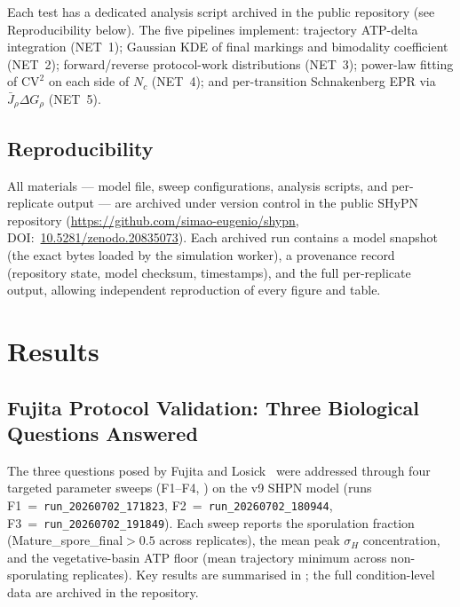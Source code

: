\documentclass[11pt,a4paper]{article}
\newcommand{\CV}{\mathrm{CV}}
\begin{document}
Each test has a dedicated analysis script archived in the public
repository (see Reproducibility below).
The five pipelines implement: trajectory ATP-delta integration
(NET~1); Gaussian KDE of final markings and bimodality coefficient
(NET~2); forward/reverse protocol-work distributions (NET~3);
power-law fitting of \(\CV^2\) on each side of \(N_c\) (NET~4);
and per-transition Schnakenberg EPR via
\(\bar J_\rho \Delta G_\rho\) (NET~5).

\subsection{Reproducibility}

All materials --- model file, sweep configurations, analysis scripts,
and per-replicate output --- are archived under version control in the
public SHyPN repository
(\url{https://github.com/simao-eugenio/shypn},
DOI:~\href{https://doi.org/10.5281/zenodo.20835073}{10.5281/zenodo.20835073}).
Each archived run contains a model snapshot (the exact bytes loaded
by the simulation worker), a provenance record (repository state,
model checksum, timestamps), and the full per-replicate output,
allowing independent reproduction of every figure and table.

\section{Results}
\label{sec:results}

\subsection{Fujita Protocol Validation: Three Biological Questions Answered}
\label{ssec:fujita_validation}

The three questions posed by Fujita and Losick~\cite{Fujita2005} were
addressed through four targeted parameter sweeps (F1--F4,
) on the v9 SHPN model (runs
F1~=~\texttt{run\_20260702\_171823}, F2~=~\texttt{run\_20260702\_180944},
F3~=~\texttt{run\_20260702\_191849}).
Each sweep reports the sporulation fraction (Mature\_spore\_final$>0.5$
across replicates), the mean peak $\sigma_H$ concentration, and the
vegetative-basin ATP floor (mean trajectory minimum across non-sporulating
replicates).
Key results are summarised in ; the full
condition-level data are archived in the repository.
\end{document}
